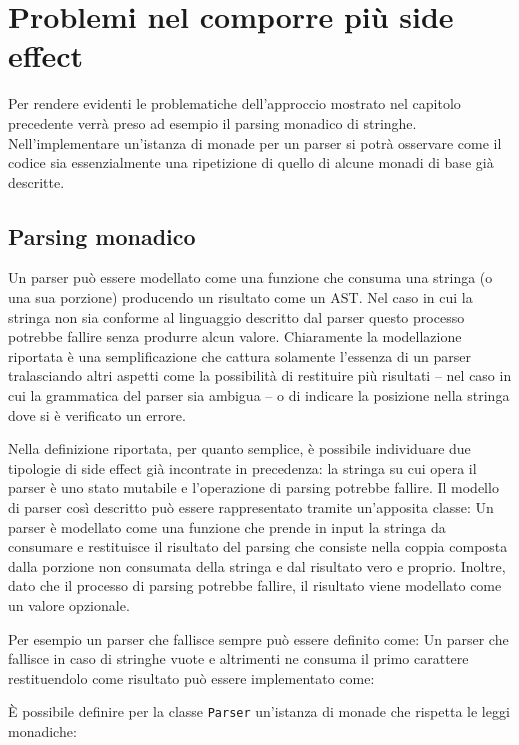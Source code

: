 \section{Problemi nel comporre più side effect}

Per rendere evidenti le problematiche dell'approccio mostrato nel capitolo precedente verrà preso ad esempio il parsing monadico di stringhe.
Nell'implementare un'istanza di monade per un parser si potrà osservare come il codice sia essenzialmente una ripetizione di quello di alcune monadi di base già descritte.

\subsection{Parsing monadico}
\label{sec:parsing-monadico}
Un parser può essere modellato come una funzione che consuma una stringa (o una sua porzione) producendo un risultato come un AST. Nel caso in cui la stringa non sia conforme al linguaggio descritto dal parser questo processo potrebbe fallire senza produrre alcun valore.
Chiaramente la modellazione riportata è una semplificazione che cattura solamente l'essenza di un parser tralasciando altri aspetti come la possibilità di restituire più risultati -- nel caso in cui la grammatica del parser sia ambigua -- o di indicare la posizione nella stringa dove si è verificato un errore.

Nella definizione riportata, per quanto semplice, è possibile individuare due tipologie di side effect già incontrate in precedenza: la stringa su cui opera il parser è uno stato mutabile e l'operazione di parsing potrebbe fallire.
Il modello di parser così descritto può essere rappresentato tramite un'apposita classe:
Un parser è modellato come una funzione che prende in input la stringa da consumare e restituisce il risultato del parsing che consiste nella coppia composta dalla porzione non consumata della stringa e dal risultato vero e proprio. Inoltre, dato che il processo di parsing potrebbe fallire, il risultato viene modellato come un valore opzionale.

Per esempio un parser che fallisce sempre può essere definito come:
Un parser che fallisce in caso di stringhe vuote e altrimenti ne consuma il primo carattere restituendolo come risultato può essere implementato come:

È possibile definire per la classe \lstinline{Parser} un'istanza di monade che rispetta le leggi monadiche:

